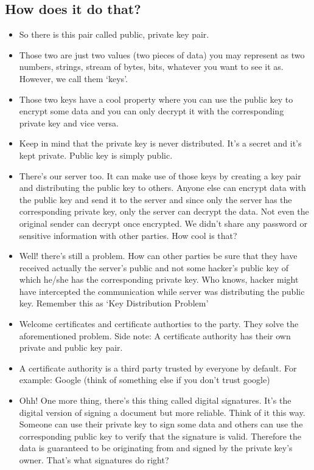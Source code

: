 \documentclass{article}
\begin{document}
    \subsection{How does it do that?}
    \begin{itemize}
        \item So there is this pair called public, private key pair.
        \item Those two are just two values (two pieces of data) you may represent as two numbers, strings, stream of bytes, bits, whatever you want to see it as. However, we call them `keys'.
        \item Those two keys have a cool property where you can use the public key to encrypt some data and you can only decrypt it with the corresponding private key and vice versa.
        \item Keep in mind that the private key is never distributed. It's a secret and it's kept private. Public key is simply public.
        \item There's our server too. It can make use of those keys by creating a key pair and distributing the public key to others. Anyone else can encrypt data with the public key and send it to the server and since only the server has the corresponding private key, only the server can decrypt the data. Not even the original sender can decrypt once encrypted. We didn't share any password or sensitive information with other parties. How cool is that?
        \item Well! there's still a problem. How can other parties be sure that they have received actually the server's public and not some hacker's public key of which he/she has the corresponding private key. Who knows, hacker might have intercepted the communication while server was distributing the public key.  Remember this as `Key Distribution Problem'
        \item Welcome certificates and certificate authorties to the party. They solve the aforementioned problem. Side note: A certificate authority has their own private and public key pair.
        \item A certificate authority is a third party trusted by everyone by default. For example: Google (think of something else if you don't trust google)
        \item Ohh! One more thing, there's this thing called digital signatures. It's the digital version of signing a document but more reliable. Think of it this way. Someone can use their private key to sign some data and others can use the corresponding public key to verify that the signature is valid. Therefore the data is guaranteed to be originating from and signed by the private key's owner. That's what signatures do right?

\end{itemize}
\end{document}
